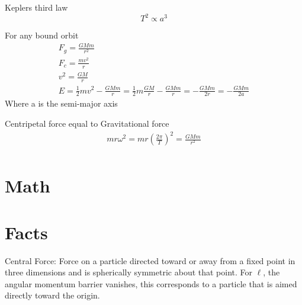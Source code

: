 \documentclass[12pt]{article}
\begin{document}
    Keplers third law
    \[
        T^2 \propto a^3
    \]


    For any bound orbit
    \begin{gather*}
        F_g = \frac{G M m}{r^2}
        \\ F_c = \frac{m v^2}{r}
        \\ v^2 = \frac{G M}{r}
        \\ E = \frac{1}{2} m v^2 - \frac{G M m}{r} = \frac{1}{2} m \frac{G M}{r} - \frac{G M m}{r} = -\frac{G M m}{2r} = -\frac{G M m}{2a}
    \end{gather*}
    Where a is the semi-major axis

    Centripetal force equal to Gravitational force
    \begin{gather*}
        m r \omega^2 = m r \left(\frac{2 \pi}{T} \right)^2 = \frac{G M m}{r^2}
        \\ 
    \end{gather*}
    


\section{Math}
    
    
    
    

    
\section{Facts}
    Central Force: Force on a particle directed toward or away from a fixed point in three dimensions and is spherically symmetric about that point. 
    \newline For $\ell$, the angular momentum barrier vanishes, this corresponds to a particle that is aimed directly toward the origin. 
\end{document}
